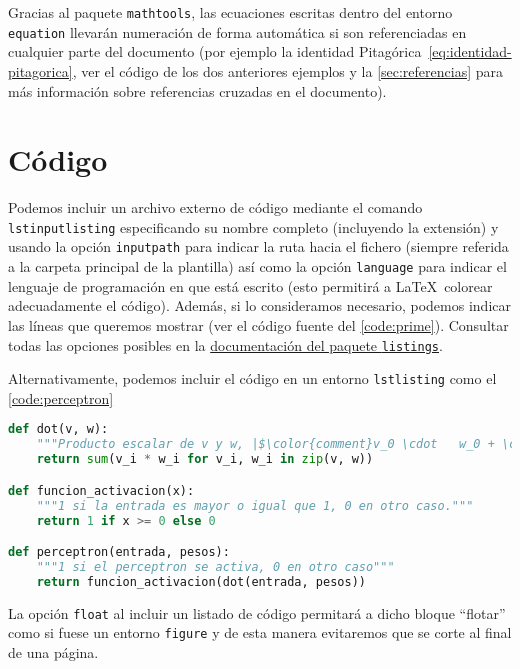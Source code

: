 Gracias al paquete \texttt{mathtools}, las ecuaciones escritas dentro del entorno \texttt{equation} llevarán numeración de forma automática si son referenciadas  en cualquier parte del documento (por ejemplo la identidad Pitagórica~\eqref{eq:identidad-pitagorica}, ver el código de los dos anteriores ejemplos y la \autoref{sec:referencias} para más información sobre referencias cruzadas en el documento).

\section{Código}

Podemos incluir un archivo externo de código mediante el comando \texttt{lstinputlisting} especificando su nombre completo (incluyendo la extensión) y usando la opción \texttt{inputpath} para indicar la ruta hacia el fichero (siempre referida a la carpeta principal de la plantilla) así como la opción \texttt{language} para indicar el lenguaje de programación en que está escrito (esto permitirá a \LaTeX\ colorear adecuadamente el código). Además, si lo consideramos necesario, podemos indicar las líneas que queremos mostrar (ver el código fuente del \autoref{code:prime}). Consultar todas las opciones posibles en la \href{https://osl.ugr.es/CTAN/macros/latex/contrib/listings/listings.pdf}{documentación del paquete \texttt{listings}}.



Alternativamente, podemos incluir el código en un entorno \texttt{lstlisting} como el \autoref{code:perceptron}

\begin{lstlisting}[caption={Implementación de un perceptrón}, label={code:perceptron}, language={python}]
def dot(v, w):
    """Producto escalar de v y w, |$\color{comment}v_0 \cdot   w_0 + \cdots + v_n \cdot w_n$|"""
    return sum(v_i * w_i for v_i, w_i in zip(v, w))

def funcion_activacion(x):
    """1 si la entrada es mayor o igual que 1, 0 en otro caso."""
    return 1 if x >= 0 else 0

def perceptron(entrada, pesos):
    """1 si el perceptron se activa, 0 en otro caso"""
    return funcion_activacion(dot(entrada, pesos))
\end{lstlisting}

La opción \texttt{float} al incluir un listado de código permitará a dicho bloque ``flotar'' como si fuese un entorno \texttt{figure} y de esta manera evitaremos que se corte al final de una página.


